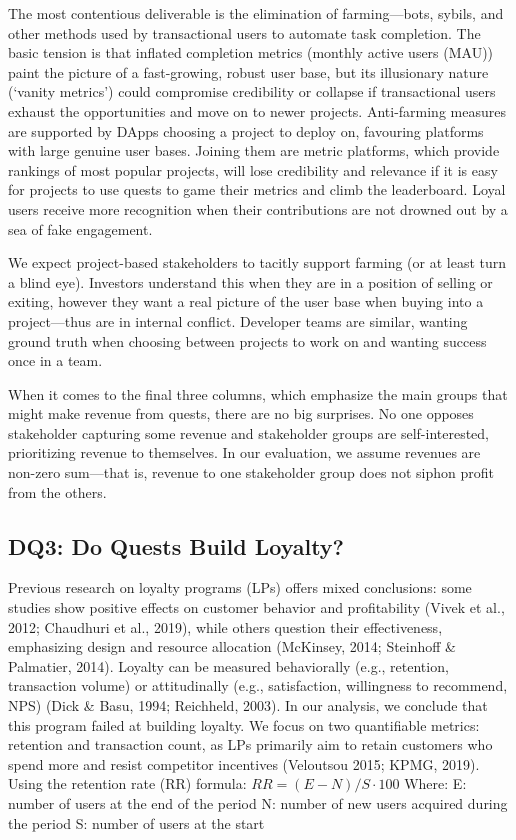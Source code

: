 The most contentious deliverable is the elimination of farming---bots, sybils, and other methods used by transactional users to automate task completion. The basic tension is that inflated completion metrics (\eg monthly active users (MAU)) paint the picture of a fast-growing, robust user base, but its illusionary nature (`vanity metrics') could compromise credibility or collapse if transactional users exhaust the opportunities and move on to newer projects. Anti-farming measures are supported by DApps choosing a project to deploy on, favouring platforms with large genuine user bases. Joining them are metric platforms, which provide rankings of most popular projects, will lose credibility and relevance if it is easy for projects to use quests to game their metrics and climb the leaderboard. Loyal users receive more recognition when their contributions are not drowned out by a sea of fake engagement.

We expect project-based stakeholders to tacitly support farming (or at least turn a blind eye). Investors understand this when they are in a position of selling or exiting, however they want a real picture of the user base when buying into a project---thus are in internal conflict. Developer teams are similar, wanting ground truth when choosing between projects to work on and wanting success once in a team. 

When it comes to the final three columns, which emphasize the main groups that might make revenue from quests, there are no big surprises. No one opposes stakeholder capturing some revenue and stakeholder groups are self-interested, prioritizing revenue to themselves. In our evaluation, we assume revenues are non-zero sum---that is, revenue to one stakeholder group does not siphon profit from the others.


\subsection{DQ3: Do Quests Build Loyalty?}

Previous research on loyalty programs (LPs) offers mixed conclusions: some studies show positive effects on customer behavior and profitability (Vivek et al., 2012; Chaudhuri et al., 2019), while others question their effectiveness, emphasizing design and resource allocation (McKinsey, 2014; Steinhoff \& Palmatier, 2014). Loyalty can be measured behaviorally (e.g., retention, transaction volume) or attitudinally (e.g., satisfaction, willingness to recommend, NPS) (Dick \& Basu, 1994; Reichheld, 2003).
In our analysis, we conclude that this program failed at building loyalty. We focus on two quantifiable metrics: retention and transaction count, as LPs primarily aim to retain customers who spend more and resist competitor incentives (Veloutsou 2015; KPMG, 2019).
Using the retention rate (RR) formula:
$RR= (E-N)/ S \cdot 100$
Where:
E: number of users at the end of the period 
N: number of new users acquired during the period
S: number of users at the start 

